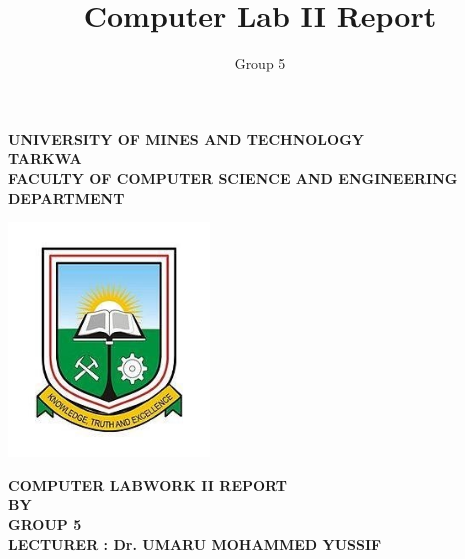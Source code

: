 \documentclass[12pt,a4paper]{report}
\author{Group 5}
\title{Computer Lab II Report}
\newcommand{\lecturer}{Dr. UMARU MOHAMMED YUSSIF}
\newcommand{\school}{
	\centering
	\textbf{\large UNIVERSITY OF MINES AND TECHNOLOGY \\TARKWA
	\vspace{1cm}	\\FACULTY OF COMPUTER SCIENCE AND ENGINEERING  DEPARTMENT}
}
\newcommand{\rpaim}{
	\centering

 \textbf{\large COMPUTER LABWORK II REPORT \\ BY \\GROUP 5\\ LECTURER : \lecturer}
}
\begin{document}
	\begin{titlepage}
		\school
		\vspace{2cm}
		\begin{center}
			\includegraphics[width=0.4\textwidth]{umat_logo.jpg} %
		\end{center}
		\vspace{1cm}
		\rpaim
		\vfill

	\end{titlepage}

	

	

	

	\tableofcontents




	
	

	
	
	

%	

\end{document}

